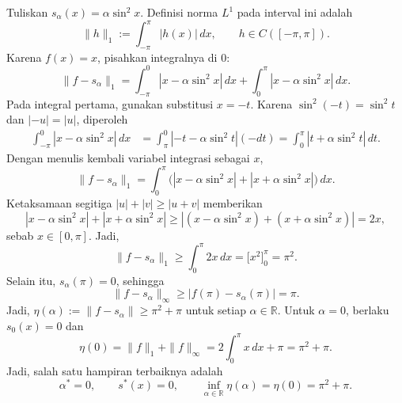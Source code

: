 \documentclass[12pt]{article}
\begin{document}
\begin{enumerate}
            Tuliskan $s_\alpha(x)=\alpha\sin^2x$.
            Definisi norma $L^1$ pada interval ini adalah
            \[
                  \|h\|_1:=\int_{-\pi}^{\pi}|h(x)|\,dx,
                  \qquad h\in C([-\pi,\pi]).
            \]
            Karena $f(x)=x$, pisahkan integralnya di $0$:
            \[
                  \|f-s_\alpha\|_1
                  =\int_{-\pi}^0|x-\alpha\sin^2x|\,dx
                  +\int_0^\pi|x-\alpha\sin^2x|\,dx.
            \]
            Pada integral pertama, gunakan substitusi $x=-t$.
            Karena $\sin^2(-t)=\sin^2t$ dan $|-u|=|u|$, diperoleh
            \begin{align*}
                  \int_{-\pi}^0|x-\alpha\sin^2x|\,dx
                   & =\int_\pi^0|-t-\alpha\sin^2t|(-dt)=\int_0^\pi|t+\alpha\sin^2t|\,dt.
            \end{align*}
            Dengan menulis kembali variabel integrasi sebagai $x$,
            \[
                  \|f-s_\alpha\|_1
                  =\int_0^\pi\bigl(|x-\alpha\sin^2x|+|x+\alpha\sin^2x|\bigr)\,dx.
            \]
            Ketaksamaan segitiga $|u|+|v|\ge|u+v|$ memberikan
            \[
                  |x-\alpha\sin^2x|+|x+\alpha\sin^2x|
                  \ge|(x-\alpha\sin^2x)+(x+\alpha\sin^2x)|
                  =2x,
            \]
            sebab $x\in[0,\pi]$.
            Jadi,
            \[
                  \|f-s_\alpha\|_1\ge\int_0^\pi2x\,dx
                  =\bigl[x^2\bigr]_0^\pi=\pi^2.
            \]
            Selain itu, $s_\alpha(\pi)=0$, sehingga
            \[
                  \|f-s_\alpha\|_\infty
                  \ge |f(\pi)-s_\alpha(\pi)|=\pi.
            \]
            Jadi, $\eta(\alpha):=\|f-s_\alpha\|\ge\pi^2+\pi$ untuk setiap $\alpha\in\mathbb{R}$.
            Untuk $\alpha=0$, berlaku $s_0(x)=0$ dan
            \[
                  \eta(0)=\|f\|_1+\|f\|_\infty
                  =2\int_0^\pi x\,dx+\pi=\pi^2+\pi.
            \]
            Jadi, salah satu hampiran terbaiknya adalah
            \[
                  \alpha^*=0,\qquad s^*(x)=0,\qquad
                  \inf_{\alpha\in\mathbb{R}}\eta(\alpha)=\eta(0)=\pi^2+\pi.
            \]

\end{enumerate}
\end{document}
